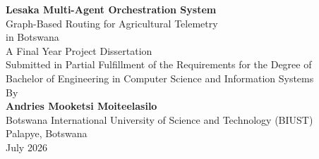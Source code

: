 
\begin{titlepage}
    \centering
    \vspace*{2cm}
    
    {\Huge \textbf{Lesaka Multi-Agent Orchestration System}}\\[1cm]
    
    {\Large Graph-Based Routing for Agricultural Telemetry}\\[0.5cm]
    
    {\Large in Botswana}\\[2cm]
    
    {\large A Final Year Project Dissertation}\\[1cm]
    
    {\large Submitted in Partial Fulfillment of the Requirements for the Degree of}\\[0.5cm]
    
    {\large Bachelor of Engineering in Computer Science and Information Systems}\\[2cm]
    
    {\large By}\\[0.5cm]
    
    {\large \textbf{Andries Mooketsi Moiteelasilo}}\\[1cm]
    
    {\large Botswana International University of Science and Technology (BIUST)}\\[0.5cm]
    
    {\large Palapye, Botswana}\\[2cm]
    
    {\large July 2026}
    
    \vspace*{2cm}
\end{titlepage}
